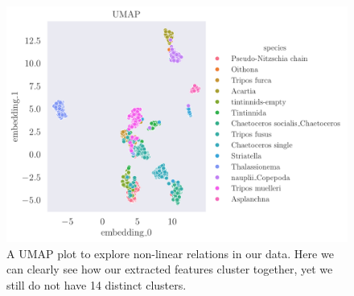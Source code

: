 \begin{figure}[H]
    \centering
    \includegraphics[width=1.1\linewidth]{examples/tests_eb/figs/umap.pdf}
    \caption{A UMAP plot to explore non-linear relations in our data. Here we can clearly see how our extracted features cluster together, yet we still do not have 14 distinct clusters.}
    \label{fig:umap}
\end{figure}

